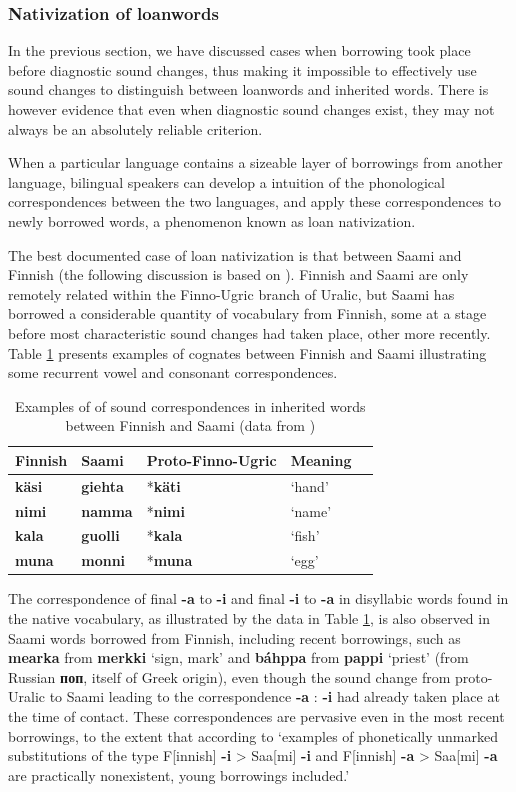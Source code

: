 \documentclass[svgnames,12pt]{scrartcl}
\newcommand{\ipa}[1]{\textbf{{\phon\mbox{#1}}}}
\begin{document}
{{\subsubsection{Nativization of loanwords}
In the previous section, we have discussed cases when borrowing took place before diagnostic sound changes, thus making it impossible to effectively use sound changes to distinguish between loanwords and inherited words. There is however evidence that even when diagnostic sound changes exist, they may not always be an absolutely reliable criterion.

When a particular language contains a sizeable layer of borrowings from another language, bilingual speakers can develop a intuition of the phonological correspondences between the two languages, and apply these correspondences to newly borrowed words, a phenomenon known as loan nativization.

The best documented case of loan nativization is that between Saami and Finnish (the following discussion is based on \citealt{aikio06nativization}). Finnish and Saami are only remotely related within the Finno-Ugric branch of Uralic, but  Saami has borrowed a considerable quantity of vocabulary from Finnish, some at a stage before most characteristic sound changes had taken place, other more recently. Table \ref{tab:native} presents examples of cognates between Finnish and Saami illustrating some recurrent vowel and consonant correspondences.

\begin{table}[h]
\caption{Examples of of sound correspondences in inherited words between Finnish and Saami (data from \citealt[27]{aikio06nativization})} \centering \label{tab:native}
\begin{tabular}{lllll}
\toprule
Finnish & Saami & Proto-Finno-Ugric & Meaning \\
\midrule
\ipa{käsi} & \ipa{giehta} & *\ipa{käti} & `hand' \\
\ipa{nimi} & \ipa{namma} & *\ipa{nimi} & `name' \\
\ipa{kala} & \ipa{guolli} & *\ipa{kala} & `fish' \\
\ipa{muna} & \ipa{monni} & *\ipa{muna} & `egg' \\
\bottomrule
\end{tabular}
\end{table}

The correspondence of final \ipa{-a} to \ipa{-i} and final \ipa{-i} to \ipa{-a} in disyllabic words found in the native vocabulary, as illustrated by the data in Table \ref{tab:native}, is also observed in Saami words borrowed from Finnish, including recent borrowings, such as \ipa{mearka} from \ipa{merkki} `sign, mark' and \ipa{báhppa} from \ipa{pappi} `priest' (from Russian \ipa{поп}, itself of Greek origin), even though the sound change from proto-Uralic to Saami leading to the correspondence \ipa{-a} : \ipa{-i} had already taken place at the time of contact. These correspondences are pervasive even in the most recent borrowings, to the extent that according to \citet[36]{aikio06nativization} `examples of phonetically unmarked substitutions of the type F[innish] \ipa{-i} > Saa[mi] \ipa{-i} and F[innish] \ipa{-a} > Saa[mi] \ipa{-a} are practically nonexistent, young borrowings included.'

}}
\end{document}

